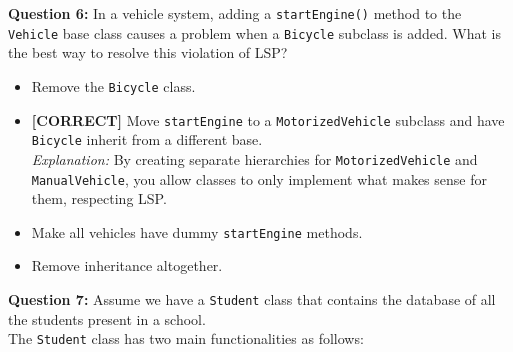 \vspace{0.3cm}
\noindent
\textbf{Question 6:} In a vehicle system, adding a \texttt{startEngine()} method to the \texttt{Vehicle} base class causes a problem when a \texttt{Bicycle} subclass is added. What is the best way to resolve this violation of LSP?
\\[0.2cm]
\begin{itemize}
 \item Remove the \texttt{Bicycle} class.
 \item \textbf{[CORRECT]} Move \texttt{startEngine} to a \texttt{MotorizedVehicle} subclass and have \texttt{Bicycle} inherit from a different base.
\\[0.1cm]
\textit{Explanation:} 
By creating separate hierarchies for \texttt{MotorizedVehicle} and \texttt{ManualVehicle}, you allow classes to only implement what makes sense for them, respecting LSP.
 \item Make all vehicles have dummy \texttt{startEngine} methods.
 \item Remove inheritance altogether.
\end{itemize}
\vspace{0.3cm}
\noindent
\textbf{Question 7:} Assume we have a \texttt{Student} class that contains the database of all the students present in a school.
\\
The \texttt{Student} class has two main functionalities as follows:


